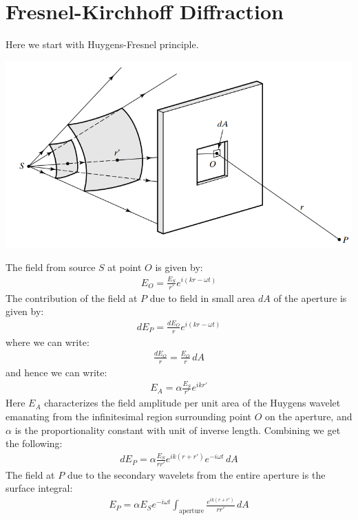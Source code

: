 \documentclass[11pt]{book}
\theoremstyle{break}
\theoremstyle{break}
\begin{document}
\section[Fresnel-Kirchhoff Diffraction]{\color{red} Fresnel-Kirchhoff Diffraction\color{black}}
Here we start with Huygens-Fresnel principle. 
\begin{center}
\includegraphics[scale=0.8]{Fresnel}
\end{center}
The field from source $S$ at point $O$ is given by:
\begin{align*}
E_O = \frac{E_S}{r'}e^{i(kr-\omega t)}
\end{align*}
The contribution of the field at $P$ due to field in small area $dA$ of the aperture is given by:
\begin{align*}
dE_P = \frac{dE_O}{r}e^{i(kr-\omega t)}
\end{align*}
where we can write:
\begin{align*}
\frac{dE_O}{r} = \frac{E_O}{r}\, dA
\end{align*}
and hence we can write:
\begin{align*}
E_A = \alpha \frac{E_S}{r'}e^{ikr'}
\end{align*}
Here $E_A$ characterizes the field amplitude per unit area of the Huygens
wavelet emanating from the infinitesimal region surrounding point $O$ on the aperture, and $\alpha$ is the proportionality constant with unit of inverse length. Combining we get the following:
\begin{align*}
dE_P = \alpha \frac{E_S}{rr'}e^{ik(r+r')}e^{-i\omega t}\, dA
\end{align*}
The field at $P$ due to the secondary wavelets from the entire aperture is the surface integral:
\begin{align}
E_P = \alpha  E_S e^{-i\omega t}\int_{\text{aperture}}\frac{e^{ik(r+r')}}{rr'}\, dA
\end{align}
\end{document}
